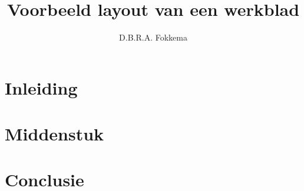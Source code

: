 

\usepackage{lipsum}

\title{Voorbeeld layout van een werkblad}
\author{D.B.R.A. Fokkema}



\maketitle

\section{Inleiding}

\lipsum[1-14]

\section{Middenstuk}

\section{Conclusie}


